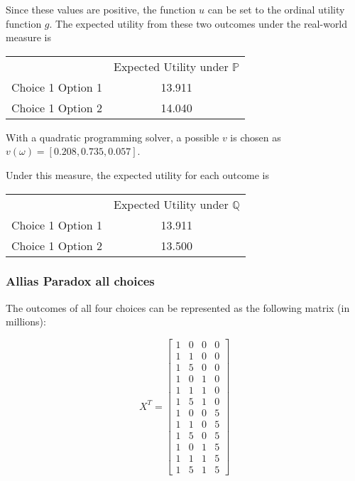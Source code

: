 \documentclass{article}
\begin{document}
Since these values are positive, the function \(u\) can be set to the ordinal utility function \(g\).  The expected utility from these two outcomes under the real-world measure is 

\begin{center} 
	\begin{tabular}{c c}
		& Expected Utility under \(\mathbb{P}\) \\
		Choice 1 Option 1 & 13.911 \\
		Choice 1 Option 2 & 14.040 \\
	\end{tabular}
\end{center}

With a quadratic programming solver, a possible \(v\) is chosen as \(v(\omega)=[0.208, 0.735, 0.057]\).

Under this measure, the expected utility for each outcome is 

\begin{center} 
	\begin{tabular}{c c}
		& Expected Utility under \(\mathbb{Q}\) \\
		Choice 1 Option 1 & 13.911 \\
		Choice 1 Option 2 & 13.500 \\
	\end{tabular}
\end{center}

\subsubsection{Allias Paradox all choices}

The outcomes of all four choices can be represented as the following matrix (in millions):

\[X^T=\begin{bmatrix}
1 & 0 & 0 & 0 \\
1 & 1 & 0 & 0 \\
1 & 5 & 0 & 0 \\
1 & 0 & 1 & 0 \\
1 & 1 & 1 & 0 \\
1 & 5 & 1 & 0 \\
1 & 0 & 0 & 5 \\
1 & 1 & 0 & 5 \\
1 & 5 & 0 & 5 \\
1 & 0 & 1 & 5 \\
1 & 1 & 1 & 5 \\
1 & 5 & 1 & 5
\end{bmatrix}\]
\end{document}
